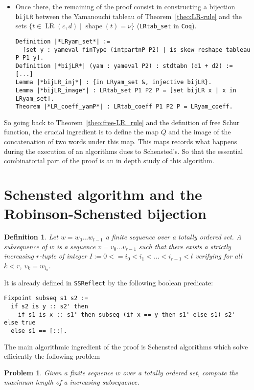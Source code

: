 \documentclass[12pt,a4paper]{article}
\let\verb=\lstinline
\newcommand{\Coq}{\texttt{Coq}\xspace}
\newcommand{\SSR}{\texttt{SSReflect}\xspace}
\newcommand{\shape}{\operatorname{shape}}
\newtheorem{PROBLEM}{Problem}
\newtheorem{DEFN}{Definition}
\begin{document}
\begin{itemize}
\begin{lstlisting}
Theorem |*LRtab_coeffP*| :
  Schur P1 * Schur P2 = \sum_P (Schur P) *+ LRtab_coeff P.
\end{lstlisting}
\item Once there, the remaining of the proof consist in constructing
  a bijection \verb{bijLR} between the Yamanouchi tableau of
  Theorem~\ref{theo:LR-rule} and the sets $\{t\in\operatorname{LR}(c, d) \mid
  \shape(t) = \nu\}$ (\verb{LRtab_set} in \Coq).
\begin{lstlisting}
Definition |*LRyam_set*| :=
  [set y : yameval_finType (intpartnP P2) | is_skew_reshape_tableau P P1 y].
Definition |*bijLR*| (yam : yameval P2) : stdtabn (d1 + d2) := [...]
Lemma |*bijLR_inj*| : {in LRyam_set &, injective bijLR}.
Lemma |*bijLR_image*| : LRtab_set P1 P2 P = [set bijLR x | x in LRyam_set].
Theorem |*LR_coeff_yamP*| : LRtab_coeff P1 P2 P = LRyam_coeff.
\end{lstlisting}
\end{itemize}
\bigskip

So going back to Theorem~\ref{theo:free-LR_rule} and the definition of free
Schur function, the crucial ingredient is to define the map $Q$ and the image
of the concatenation of two words under this map. This maps records what
happens during the execution of an algorithms dues to Schensted's. So that the
essential combinatorial part of the proof is an in depth study of this
algorithm.

\section{Schensted algorithm and the Robinson-Schensted bijection}

\begin{DEFN}
  Let $w = w_0\dots w_{l-1}$ a finite sequence over a totally ordered set. A
  \emph{subsequence} of $w$ is a sequence $v=v_0\dots v_{r-1}$ such that there exists
  a strictly increasing $r$-tuple of integer $I:=0<=i_0<i_1<\dots<i_{r-1}<l$
  verifying for all $k<r$, $v_k = w_{i_k}$.
\end{DEFN}
It is already defined in \SSR by the following boolean predicate:

\begin{lstlisting}
Fixpoint subseq s1 s2 :=
  if s2 is y :: s2' then
    if s1 is x :: s1' then subseq (if x == y then s1' else s1) s2' else true
  else s1 == [::].
\end{lstlisting}


The main algorithmic ingredient of the proof is Schensted algorithms which
solve efficiently the following problem
\begin{PROBLEM}
  Given a finite sequence $w$ over a totally ordered set, compute the maximum
  length of a increasing subsequence.
\end{PROBLEM}
\end{document}
